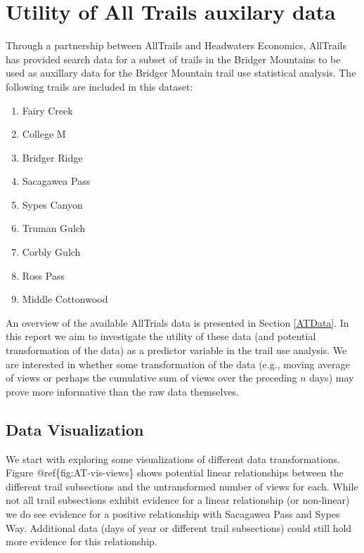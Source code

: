 \documentclass[
]{book}
\providecommand{\tightlist}{%
  \setlength{\itemsep}{0pt}\setlength{\parskip}{0pt}}
\begin{document}
\hypertarget{appendix-appendix}{%
\appendix}


\hypertarget{ATDataUtility}{%
\chapter{Utility of All Trails auxilary data}\label{ATDataUtility}}

Through a partnership between AllTrails and Headwaters Economics, AllTrails has provided search data for a subset of trails in the Bridger Mountains to be used as auxillary data for the Bridger Mountain trail use statistical analysis. The following trails are included in this dataset:

\begin{enumerate}
\def\labelenumi{\arabic{enumi}.}
\tightlist
\item
  Fairy Creek
\item
  College M
\item
  Bridger Ridge
\item
  Sacagawea Pass
\item
  Sypes Canyon
\item
  Truman Gulch
\item
  Corbly Gulch
\item
  Ross Pass
\item
  Middle Cottonwood
\end{enumerate}

An overview of the available AllTrials data is presented in Section \ref{ATData}. In this report we aim to investigate the utility of these data (and potential transformation of the data) as a predictor variable in the trail use analysis. We are interested in whether some transformation of the data (e.g., moving average of views or perhaps the cumulative sum of views over the preceding \(n\) days) may prove more informative than the raw data themselves.

\hypertarget{data-visualization}{%
\section{Data Visualization}\label{data-visualization}}

We start with exploring some visualizations of different data transformations. Figure @ref\{fig:AT-vis-views\} shows potential linear relationships between the different trail subsections and the untransformed number of views for each. While not all trail subsections exhibit evidence for a linear relationship (or non-linear) we do see evidence for a positive relationship with Sacagawea Pass and Sypes Way. Additional data (days of year or different trail subsections) could still hold more evidence for this relationship.
\end{document}
